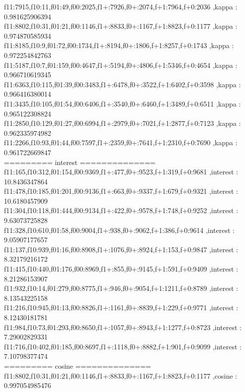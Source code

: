\documentclass{article}
\begin{document}
f11:7915,f10:11,f01:49,f00:2025,f1+:7926,f0+:2074,f+1:7964,f+0:2036 ,kappa : 0.981625906394\\
f11:8802,f10:31,f01:21,f00:1146,f1+:8833,f0+:1167,f+1:8823,f+0:1177 ,kappa : 0.974870585934\\
f11:8185,f10:9,f01:72,f00:1734,f1+:8194,f0+:1806,f+1:8257,f+0:1743 ,kappa : 0.972254842763\\
f11:5187,f10:7,f01:159,f00:4647,f1+:5194,f0+:4806,f+1:5346,f+0:4654 ,kappa : 0.966710619345\\
f11:6363,f10:115,f01:39,f00:3483,f1+:6478,f0+:3522,f+1:6402,f+0:3598 ,kappa : 0.966416380014\\
f11:3435,f10:105,f01:54,f00:6406,f1+:3540,f0+:6460,f+1:3489,f+0:6511 ,kappa : 0.965122308824\\
f11:2850,f10:129,f01:27,f00:6994,f1+:2979,f0+:7021,f+1:2877,f+0:7123 ,kappa : 0.962335974982\\
f11:2266,f10:93,f01:44,f00:7597,f1+:2359,f0+:7641,f+1:2310,f+0:7690 ,kappa : 0.961722669847\\
========= interest ==============\\
f11:165,f10:312,f01:154,f00:9369,f1+:477,f0+:9523,f+1:319,f+0:9681 ,interest : 10.8436347864\\
f11:478,f10:185,f01:201,f00:9136,f1+:663,f0+:9337,f+1:679,f+0:9321 ,interest : 10.6180457909\\
f11:304,f10:118,f01:444,f00:9134,f1+:422,f0+:9578,f+1:748,f+0:9252 ,interest : 9.63073725828\\
f11:328,f10:610,f01:58,f00:9004,f1+:938,f0+:9062,f+1:386,f+0:9614 ,interest : 9.05907177657\\
f11:137,f10:939,f01:16,f00:8908,f1+:1076,f0+:8924,f+1:153,f+0:9847 ,interest : 8.32179216172\\
f11:415,f10:440,f01:176,f00:8969,f1+:855,f0+:9145,f+1:591,f+0:9409 ,interest : 8.21286153907\\
f11:932,f10:14,f01:279,f00:8775,f1+:946,f0+:9054,f+1:1211,f+0:8789 ,interest : 8.13543225158\\
f11:216,f10:945,f01:13,f00:8826,f1+:1161,f0+:8839,f+1:229,f+0:9771 ,interest : 8.12430181781\\
f11:984,f10:73,f01:293,f00:8650,f1+:1057,f0+:8943,f+1:1277,f+0:8723 ,interest : 7.29002829331\\
f11:716,f10:402,f01:185,f00:8697,f1+:1118,f0+:8882,f+1:901,f+0:9099 ,interest : 7.10798377474\\
========= cosine ==============\\
f11:8802,f10:31,f01:21,f00:1146,f1+:8833,f0+:1167,f+1:8823,f+0:1177 ,cosine : 0.997054985476\\
\end{document}
